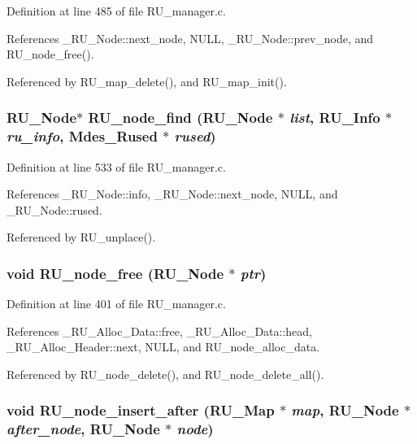 Definition at line 485 of file RU\_\-manager.c.

References \_\-RU\_\-Node::next\_\-node, NULL, \_\-RU\_\-Node::prev\_\-node, and RU\_\-node\_\-free().

Referenced by RU\_\-map\_\-delete(), and RU\_\-map\_\-init().
\subsubsection{\setlength{\rightskip}{0pt plus 5cm}\bf{RU\_\-Node}$\ast$ RU\_\-node\_\-find (\bf{RU\_\-Node} $\ast$ {\em list}, \bf{RU\_\-Info} $\ast$ {\em ru\_\-info}, Mdes\_\-Rused $\ast$ {\em rused})}\label{RU__manager_8c_8bc3a24cb101b8e888e5ca4cdcdd46cd}




Definition at line 533 of file RU\_\-manager.c.

References \_\-RU\_\-Node::info, \_\-RU\_\-Node::next\_\-node, NULL, and \_\-RU\_\-Node::rused.

Referenced by RU\_\-unplace().
\subsubsection{\setlength{\rightskip}{0pt plus 5cm}void RU\_\-node\_\-free (\bf{RU\_\-Node} $\ast$ {\em ptr})}\label{RU__manager_8c_3b6792cb608faebaff731d21aaf3280d}




Definition at line 401 of file RU\_\-manager.c.

References \_\-RU\_\-Alloc\_\-Data::free, \_\-RU\_\-Alloc\_\-Data::head, \_\-RU\_\-Alloc\_\-Header::next, NULL, and RU\_\-node\_\-alloc\_\-data.

Referenced by RU\_\-node\_\-delete(), and RU\_\-node\_\-delete\_\-all().
\subsubsection{\setlength{\rightskip}{0pt plus 5cm}void RU\_\-node\_\-insert\_\-after (\bf{RU\_\-Map} $\ast$ {\em map}, \bf{RU\_\-Node} $\ast$ {\em after\_\-node}, \bf{RU\_\-Node} $\ast$ {\em node})}\label{RU__manager_8c_24938ed1acf23555ac3375874f2dc36e}




